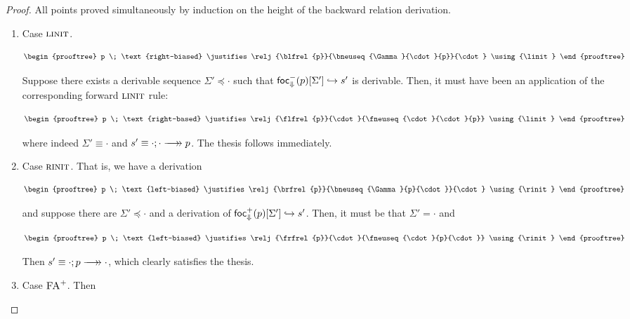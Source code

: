 \begin{proof}
  All points proved simultaneously by induction on the height of the backward
  relation derivation.

  \begin{enumerate}
  \item Case $\textsc{linit}$.

    \[
      \begin{prooftree}
        p \; \text{right-biased}
        \justifies
        \relj{\blfrel{p}}{\bneuseq{\Gamma}{\cdot}{p}}{\cdot}
        \using{\linit}
      \end{prooftree}
    \]

    Suppose there exists a derivable sequence $\Sigma' \preceq \cdot$ such that
    $\textsf{foc}^-_{\Downarrow}(p) [\Sigma'] \hookrightarrow s'$ is derivable. Then, it must have been an
    application of the corresponding forward $\textsc{linit}$ rule:

    \[
      \begin{prooftree}
        p \; \text{right-based}
        \justifies
        \relj{\flfrel{p}}{\cdot}{\fneuseq{\cdot}{\cdot}{p}}
        \using{\linit}
      \end{prooftree}
    \]

    where indeed $\Sigma' \equiv \cdot$ and $s' \equiv
    \fneuseq{\cdot}{\cdot}{p}$. The thesis follows immediately.

  \item Case $\textsc{rinit}$. That is, we have a derivation

    \[
      \begin{prooftree}
        p \; \text{left-biased}
        \justifies
        \relj{\brfrel{p}}{\bneuseq{\Gamma}{p}{\cdot}}{\cdot}
        \using{\rinit}
      \end{prooftree}
    \]

    and suppose there are $\Sigma' \preceq \cdot$ and a derivation of
    $\textsf{foc}^+_{\Downarrow}(p) [\Sigma'] \hookrightarrow s'$. Then, it must be that $\Sigma' = \cdot$ and

    \[
      \begin{prooftree}
        p \; \text{left-biased}
        \justifies
        \relj{\frfrel{p}}{\cdot}{\fneuseq{\cdot}{p}{\cdot}}
        \using{\rinit}
      \end{prooftree}
    \]

    Then $s' \equiv \fneuseq{\cdot}{p}{\cdot}$, which clearly satisfies the
    thesis.

  \item Case $\textsc{FA}^+$. Then


\end{enumerate}
\end{proof}
